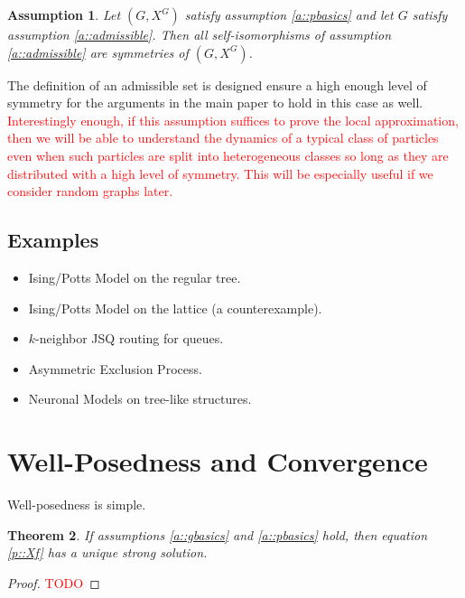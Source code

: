 \documentclass[12pt]{article}
\newcommand{\tr}{\textcolor{red}}
\newcommand{\Xf}{X}									%
\newcommand{\gind}[1]{^{#1}}						%
\newtheorem{thms}{Theorem}[section]
\newtheorem{assu}[thms]{Assumption}
\begin{document}
\begin{assu}
Let \((G,\Xf\gind{G})\) satisfy assumption \ref{a::pbasics} and let \(G\) satisfy assumption \ref{a::admissible}. Then all self-isomorphisms of assumption \ref{a::admissible} are symmetries of \((G,\Xf\gind{G})\).
\label{a::padmin}
\end{assu}

The definition of an admissible set is designed ensure a high enough level of symmetry for the arguments in the main paper to hold in this case as well. \tr{Interestingly enough, if this assumption suffices to prove the local approximation, then we will be able to understand the dynamics of a typical class of particles even when such particles are split into heterogeneous classes so long as they are distributed with a high level of symmetry. This will be especially useful if we consider random graphs later.}

\subsection{Examples}
\label{e::not}

\begin{itemize}
\item Ising/Potts Model on the regular tree.

\item Ising/Potts Model on the lattice (a counterexample).

\item \(k\)-neighbor JSQ routing for queues.

\item Asymmetric Exclusion Process.

\item Neuronal Models on tree-like structures.
\end{itemize}

\section{Well-Posedness and Convergence}
\label{WP}

Well-posedness is simple.

\begin{thms}
If assumptions \ref{a::gbasics} and \ref{a::pbasics} hold, then equation \eqref{p::Xf} has a unique strong solution.
\label{WP::WP}
\end{thms}
\begin{proof}
\tr{TODO}
\end{proof}
\end{document}
